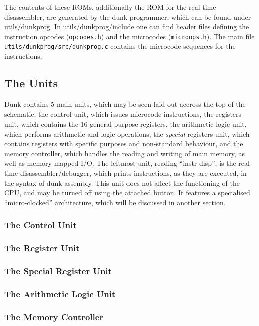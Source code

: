 \documentclass{article}
\begin{document}
The contents of these ROMs, additionally the ROM for the real-time disassembler, are generated by the dunk programmer, which can be found under utils/dunkprog. In utils/dunkprog/include one can find header files defining the instruction opcodes (\Verb|opcodes.h|) and the microcodes (\Verb|microops.h|). The main file \Verb|utils/dunkprog/src/dunkprog.c| contains the microcode sequences for the instructions.

\subsection{The Units}

Dunk contains 5 main units, which may be seen laid out accross the top of the schematic; the control unit, which issues microcode instructions, the registers unit, which contains the 16 general-purpose registers, the arithmetic logic unit, which performs arithmetic and logic operations, the \textit{special} registers unit, which contains registers with specific purposes and non-standard behaviour, and the memory controller, which handles the reading and writing of main memory, as well as memory-mapped I/O. The leftmost unit, reading ``instr disp'', is the real-time disassembler/debugger, which prints instructions, as they are executed, in the syntax of dunk assembly. This unit does not affect the functioning of the CPU, and may be turned off using the attached button. It features a specialised ``micro-clocked'' architecture, which will be discussed in another section.

\subsubsection{The Control Unit}

\subsubsection{The Register Unit}

\subsubsection{The Special Register Unit}

\subsubsection{The Arithmetic Logic Unit}

\subsubsection{The Memory Controller}
\end{document}

